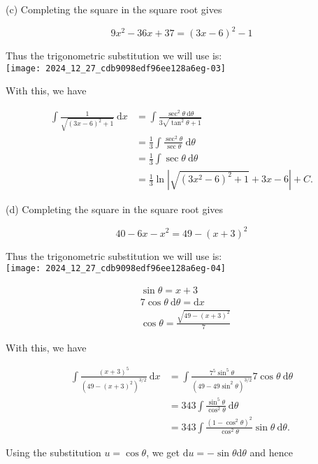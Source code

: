 \documentclass[10pt]{article}
\begin{document}
(c) Completing the square in the square root gives

$$
9 x^{2}-36 x+37=(3 x-6)^{2}-1
$$

Thus the trigonometric substitution we will use is:\\
\texttt{[image: 2024\_12\_27\_cdb9098edf96ee128a6eg-03]}

With this, we have

$$
\begin{aligned}
\int \frac{1}{\sqrt{(3 x-6)^{2}+1}} \mathrm{~d} x & =\int \frac{\sec ^{2} \theta \mathrm{~d} \theta}{3 \sqrt{\tan ^{2} \theta+1}} \\
& =\frac{1}{3} \int \frac{\sec ^{2} \theta}{\sec \theta} \mathrm{~d} \theta \\
& =\frac{1}{3} \int \sec \theta \mathrm{~d} \theta \\
& =\frac{1}{3} \ln \left|\sqrt{\left(3 x^{2}-6\right)^{2}+1}+3 x-6\right|+C .
\end{aligned}
$$

(d) Completing the square in the square root gives

$$
40-6 x-x^{2}=49-(x+3)^{2}
$$

Thus the trigonometric substitution we will use is:\\
\texttt{[image: 2024\_12\_27\_cdb9098edf96ee128a6eg-04]}

$$
\begin{aligned}
& \sin \theta=x+3 \\
& 7 \cos \theta \mathrm{~d} \theta=\mathrm{d} x \\
& \cos \theta=\frac{\sqrt{49-(x+3)^{2}}}{7}
\end{aligned}
$$

With this, we have

$$
\begin{aligned}
\int \frac{(x+3)^{5}}{\left(49-(x+3)^{2}\right)^{3 / 2}} \mathrm{~d} x & =\int \frac{7^{5} \sin ^{5} \theta}{\left(49-49 \sin ^{2} \theta\right)^{3 / 2}} 7 \cos \theta \mathrm{~d} \theta \\
& =343 \int \frac{\sin ^{5} \theta}{\cos ^{2} \theta} \mathrm{~d} \theta \\
& =343 \int \frac{\left(1-\cos ^{2} \theta\right)^{2}}{\cos ^{2} \theta} \sin \theta \mathrm{~d} \theta .
\end{aligned}
$$

Using the substitution $u=\cos \theta$, we get $\mathrm{d} u=-\sin \theta \mathrm{d} \theta$ and hence
\end{document}
